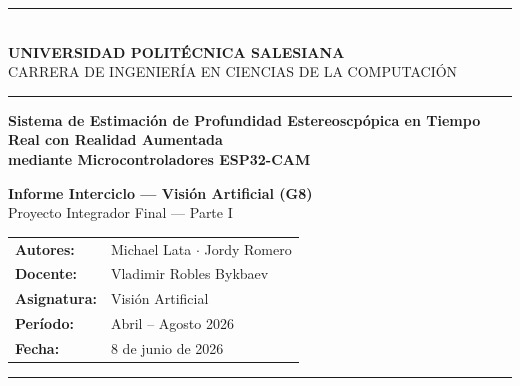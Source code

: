 \documentclass[12pt, a4paper]{article}
\begin{document}
\begin{titlepage}
\centering
\vspace*{0.8cm}
{\color{salesiana}\rule{\linewidth}{2pt}}\\[0.35cm]
{\Large\bfseries UNIVERSIDAD POLIT\'ECNICA SALESIANA}\\[0.15cm]
{\normalsize CARRERA DE INGENIER\'IA EN CIENCIAS DE LA COMPUTACI\'ON}\\[0.2cm]
{\color{salesiana}\rule{\linewidth}{1pt}}

\vspace{2.2cm}

\parbox{0.80\textwidth}{\centering\LARGE\bfseries\color{salesiana}
  Sistema de Estimaci\'on de Profundidad Estereoscp\'opica
  en Tiempo Real con Realidad Aumentada\\[0.3cm]
  \large mediante Microcontroladores ESP32-CAM
}

\vspace{1.4cm}

{\large\bfseries Informe Interciclo --- Visi\'on Artificial (G8)}\\[0.2cm]
{\normalsize Proyecto Integrador Final --- Parte I}

\vspace{1.6cm}

\begin{tabular}{@{}ll@{}}
\textbf{Autores:}    & Michael Lata $\cdot$ Jordy Romero \\[0.25cm]
\textbf{Docente:}    & Vladimir Robles Bykbaev \\[0.25cm]
\textbf{Asignatura:} & Visi\'on Artificial \\[0.25cm]
\textbf{Per\'iodo:}  & Abril -- Agosto 2026 \\[0.25cm]
\textbf{Fecha:}      & 8 de junio de 2026 \\
\end{tabular}

\vfill
{\color{salesiana}\rule{\linewidth}{2pt}}
\end{titlepage}
\end{document}

